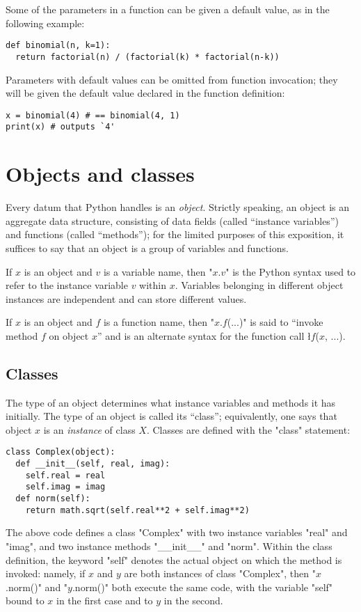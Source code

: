 {Some of the parameters in a function can be given a default value, as
in the following example:
\begin{lstlisting}
def binomial(n, k=1):
  return factorial(n) / (factorial(k) * factorial(n-k))
\end{lstlisting}
Parameters with default values can be omitted from function
invocation; they will be given the default value declared in the
function definition:
\begin{lstlisting}
x = binomial(4) # == binomial(4, 1)
print(x) # outputs `4'
\end{lstlisting}


\section{Objects and classes}
\label{sec:objects}

Every datum that Python handles is an \emph{object}.  Strictly
speaking, an object is an aggregate data structure, consisting of data
fields (called ``instance variables'') and functions (called
``methods''); for the limited purposes of this exposition, it suffices
to say that an object is a group of variables and functions.

If $x$ is an object and $v$ is a variable name, then "$x$.$v$" is
the Python syntax used to refer to the instance variable $v$ within
$x$. Variables belonging in different object instances are independent
and can store different values.

If $x$ is an object and $f$ is a function name, then
"$x$.$f$($...$)" is said to ``invoke method $f$ on object $x$''
and is an alternate syntax for the function call \l{$f$($x$, $...$)}.

\subsection{Classes}
\label{sec:classes}

The type of an object determines what instance variables and methods
it has initially.  The type of an object is called its ``class'';
equivalently, one says that object $x$ is an \emph{instance} of class
$X$.  Classes are defined with the "class" statement:
\begin{lstlisting}
class Complex(object):
  def __init__(self, real, imag):
    self.real = real
    self.imag = imag
  def norm(self):
    return math.sqrt(self.real**2 + self.imag**2)
\end{lstlisting}
The above code defines a class "Complex" with two instance variables
"real" and "imag", and two instance methods "__init__" and
"norm".  Within the class definition, the keyword "self" denotes
the actual object on which the method is invoked: namely, if $x$ and
$y$ are both instances of class "Complex", then "$x$.norm()" and
"$y$.norm()" both execute the same code, with the variable "self"
bound to $x$ in the first case and to $y$ in the second. 

}
